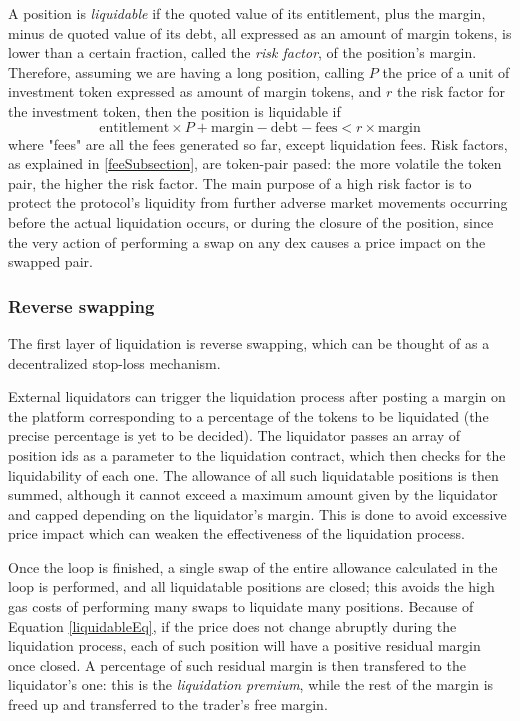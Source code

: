 \documentclass [10pt, fancyhdr, twoside] {article}
\begin{document}
A position is \textit{liquidable} if the quoted value of its entitlement, plus the margin, minus de quoted value of its debt, all expressed as an amount of margin tokens, is lower than a certain fraction, called the \textit{risk factor}, of the position's margin. Therefore, assuming we are having a long position, calling $P$ the price of a unit of investment token expressed as amount of margin tokens, and $r$ the risk factor for the investment token, then the position is liquidable if
\begin{equation}\label{liquidableEq}
\text{entitlement} \times P + \text{margin} - \text{debt} - \text{fees} < r \times \text{margin}
\end{equation}
where "fees" are all the fees generated so far, except liquidation fees.
Risk factors, as explained in \ref{feeSubsection}, are token-pair pased: the more volatile the token pair, the higher the risk factor. The main purpose of a high risk factor is to protect the protocol's liquidity from further adverse market movements occurring before the actual liquidation occurs, or during the closure of the position, since the very action of performing a swap on any dex causes a price impact on the swapped pair.

\subsubsection{Reverse swapping}\label{reverseSwapping}

The first layer of liquidation is reverse swapping, which can be thought of as a decentralized stop-loss mechanism.

External liquidators can trigger the liquidation process after posting a margin on the platform corresponding to a percentage of the tokens to be liquidated (the precise percentage is yet to be decided). The liquidator passes an array of position ids as a parameter to the liquidation contract, which then checks for the liquidability of each one. The allowance of all such liquidatable positions is then summed, although it cannot exceed a maximum amount given by the liquidator and capped depending on the liquidator's margin. This is done to avoid excessive price impact which can weaken the effectiveness of the liquidation process.

Once the loop is finished, a single swap of the entire allowance calculated in the loop is performed, and all liquidatable positions are closed; this avoids the high gas costs of performing many swaps to liquidate many positions. Because of Equation \eqref{liquidableEq}, if the price does not change abruptly during the liquidation process, each of such position will have a positive residual margin once closed. A percentage of such residual margin is then transfered to the liquidator's one: this is the \textit{liquidation premium}, while the rest of the margin is freed up and transferred to the trader's free margin.
\end{document}
